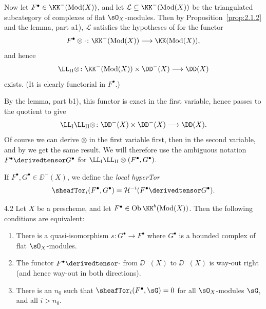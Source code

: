 Now let $F^\bullet\in\KK^-(\operatorname{Mod}(X))$, and let $\mathcal{L}\subseteq\KK^-(\operatorname{Mod}(X))$ be the triangulated subcategory of complexes of flat $\sO_X$-modules. Then by Proposition~\ref{prop:2.1.2} and the lemma, part a1), $\mathcal{L}$ satisfies the hypotheses of  for the functor
\[
F^\bullet\otimes\cdot\colon \KK^-(\operatorname{Mod}(X)) \longrightarrow \KK(\operatorname{Mod}(X)),
\]
and hence
\[
\LL_{\mathrm{II}}\otimes\colon \KK^-(\operatorname{Mod}(X)) \times \DD^-(X) \longrightarrow \DD(X)
\]
exists. (It is clearly functorial in $F^\bullet$.)

By the lemma, part b1), this functor is exact in the first variable, hence passes to the quotient to give
\[
\LL_{\mathrm{I}}\LL_{\mathrm{II}}\otimes\colon \DD^-(X) \times \DD^-(X) \longrightarrow \DD(X).
\]
Of course we can derive $\otimes$ in the first variable first, then in the second variable, and by  we get the same result. We will therefore use the ambiguous notation $F^\bullet \derivedtensor G^\bullet$ for $\LL_{\mathrm{I}}\LL_{\mathrm{II}}\otimes(F^\bullet,G^\bullet)$.

\begin{definition*}
If $F^\bullet,G^\bullet\in\DD^-(X)$, we define the \emph{local hyperTor}
\[
\sheafTor_i(F^\bullet,G^\bullet) = \mathcal{H}^{-i}(F^\bullet\derivedtensor G^\bullet).
\]
\end{definition*}

\begin{bookproposition}{4.2}\label{prop:2.4.2}
Let $X$ be a prescheme, and let $F^\bullet\in\operatorname{Ob}\KK^b(\operatorname{Mod}(X))$. Then the following conditions are equivalent:
\begin{enumerate}
\item[(i)] There is a quasi-isomorphism $s\colon G^\bullet\to F^\bullet$ where $G^\bullet$ is a bounded complex of flat $\sO_X$-modules.
\item[(ii)] The functor $F^\bullet\derivedtensor\cdot$ from $\DD^-(X)$ to $\DD^-(X)$ is way-out right (and hence way-out in both directions).
\item[(iii)] There is an $n_0$ such that $\sheafTor_i(F^\bullet,\sG)=0$ for all $\sO_X$-modules $\sG$, and all $i>n_0$.
\end{enumerate}
\end{bookproposition}

